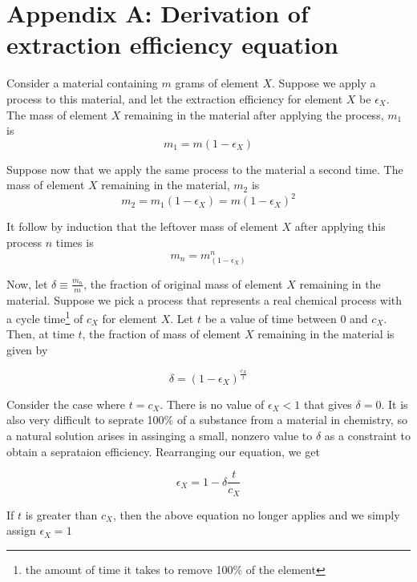 \chapter{Appendix A: Derivation of extraction efficiency equation}
\label{appex:extraction-efficiency}

Consider a material containing $m$ grams of element $X$. Suppose we apply
a process to this material, and let the extraction efficiency for element $X$ be
$\epsilon_{X}$. The mass of element $X$ remaining in the material after applying
the process, $m_{1}$ is
\begin{equation}
   m_{1} = m(1-\epsilon_{X}) 
\end{equation}

Suppose now that we apply the same process to the material a second time. The mass of element $X$ remaining in the material, $m_{2}$ is 
\begin{equation}
    m_{2} = m_{1}(1-\epsilon_{X}) = m(1-\epsilon_{X})^{2}
\end{equation}

It follow by induction that the leftover mass of element $X$ after applying this
process $n$ times is
\begin{equation}
    m_{n} = m_(1-\epsilon_{X})^{n}
\end{equation}

Now, let $\delta \equiv \frac{m_{n}}{m}$, the fraction of original mass of
element $X$ remaining in the material. Suppose we pick a process that represents
a real chemical process with a cycle time\footnote{the amount of time it takes
to remove 100\% of the element} of $c_{X}$ for element $X$. Let $t$ be a value
of time between 0 and $c_{X}$. Then, at time $t$, the fraction of mass
of element $X$ remaining in the material is given by

\begin{equation}
    \delta = (1-\epsilon_{X})^{\frac{c_{X}}{t}}
\end{equation}

Consider the case where $t=c_{X}$. There is no value of $\epsilon_{X} < 1$ that
gives $\delta = 0$. It is also very difficult to seprate 100\% of a substance
from a material in chemistry, so a natural solution arises in assinging a small,
nonzero value to $\delta$ as a constraint to obtain a seprataion efficiency.
Rearranging our equation, we get

\begin{equation}
    \epsilon_{X} = 1 - \delta\frac{t}{c_{X}}
\end{equation}

If $t$ is greater than $c_{X}$, then the above equation no longer applies and we simply assign $\epsilon_{X} = 1$



